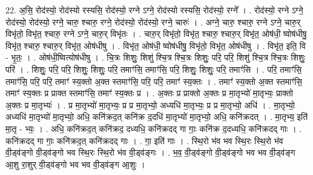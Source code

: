 \documentclass[17pt]{extarticle}
\begin{document}
22. अ॒सि॒ रोद॑स्यो॒ रोद॑स्यो रस्यसि॒ रोद॑स्यो॒ रग्ने ऽग्ने॒ रोद॑स्यो रस्यसि॒ रोद॑स्यो॒ रग्ने᳚ । . रोद॑स्यो॒ रग्ने ऽग्ने॒ रोद॑स्यो॒ रोद॑स्यो॒ रग्ने॒ चारु॒ श्चारु॒ रग्ने॒ रोद॑स्यो॒ रोद॑स्यो॒ रग्ने॒ चारुः॑ । . अग्ने॒ चारु॒ श्चारु॒ रग्ने ऽग्ने॒ चारु॒र् विभृ॑तो॒ विभृ॑त॒ श्चारु॒ रग्ने ऽग्ने॒ चारु॒र् विभृ॑तः । . चारु॒र् विभृ॑तो॒ विभृ॑त॒ श्चारु॒ श्चारु॒र् विभृ॑त॒ ओष॑धी॒ ष्वोष॑धीषु॒ विभृ॑त॒ श्चारु॒ श्चारु॒र् विभृ॑त॒ ओष॑धीषु । . विभृ॑त॒ ओष॑धी॒ ष्वोष॑धीषु॒ विभृ॑तो॒ विभृ॑त॒ ओष॑धीषु । . विभृ॑त॒ इति॒ वि - भृ॒तः॒ । . ओष॑धी॒ष्वित्योष॑धीषु । . चि॒त्रः शिशुः॒ शिशु॑ श्चि॒त्र श्चि॒त्रः शिशुः॒ परि॒ परि॒ शिशु॑ श्चि॒त्र श्चि॒त्रः शिशुः॒ परि॑ । . शिशुः॒ परि॒ परि॒ शिशुः॒ शिशुः॒ परि॒ तमाꣳ॑सि॒ तमाꣳ॑सि॒ परि॒ शिशुः॒ शिशुः॒ परि॒ तमाꣳ॑सि । . परि॒ तमाꣳ॑सि॒ तमाꣳ॑सि॒ परि॒ परि॒ तमाꣳ॑ स्य॒क्तो अ॒क्त स्तमाꣳ॑सि॒ परि॒ परि॒ तमाꣳ॑ स्य॒क्तः । . तमाꣳ॑ स्य॒क्तो अ॒क्त स्तमाꣳ॑सि॒ तमाꣳ॑ स्य॒क्तः प्र प्राक्त स्तमाꣳ॑सि॒ तमाꣳ॑ स्य॒क्तः प्र । . अ॒क्तः प्र प्राक्तो अ॒क्तः प्र मा॒तृभ्यो॑ मा॒तृभ्यः॒ प्राक्तो अ॒क्तः प्र मा॒तृभ्यः॑ । . प्र मा॒तृभ्यो॑ मा॒तृभ्यः॒ प्र प्र मा॒तृभ्यो॒ अध्यधि॑ मा॒तृभ्यः॒ प्र प्र मा॒तृभ्यो॒ अधि॑ । . मा॒तृभ्यो॒ अध्यधि॑ मा॒तृभ्यो॑ मा॒तृभ्यो॒ अधि॒ कनि॑क्रद॒त् कनि॑क्र द॒दधि॑ मा॒तृभ्यो॑ मा॒तृभ्यो॒ अधि॒ कनि॑क्रदत् । . मा॒तृभ्य॒ इति॑ मा॒तृ - भ्यः॒ । . अधि॒ कनि॑क्रद॒त् कनि॑क्रद॒ दध्यधि॒ कनि॑क्रदद् गा गाः॒ कनि॑क्र द॒दध्यधि॒ कनि॑क्रदद् गाः । . कनि॑क्रदद् गा गाः॒ कनि॑क्रद॒त् कनि॑क्रदद् गाः । . गा॒ इति॑ गाः । . स्थि॒रो भ॑व भव स्थि॒रः स्थि॒रो भ॑व वी॒ड्व॑ङ्गो वी॒ड्व॑ङ्गो भव स्थि॒रः स्थि॒रो भ॑व वी॒ड्व॑ङ्गः । . भ॒व॒ वी॒ड्व॑ङ्गो वी॒ड्व॑ङ्गो भव भव वी॒ड्व॑ङ्ग आ॒शु रा॒शुर् वी॒ड्व॑ङ्गो भव भव वी॒ड्व॑ङ्ग आ॒शुः । \newline
\end{document}

